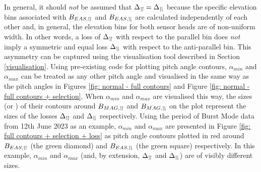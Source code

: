 In general, it should \textit{not} be assumed that \(\Delta_{\upharpoonleft \! \upharpoonright}=\Delta_{\upharpoonleft \! \downharpoonright}\) because the specific elevation bins associated with \(B_{EAS, \upharpoonleft \! \upharpoonright}\) and \(B_{EAS, \upharpoonleft \! \downharpoonright}\) are calculated independently of each other and, in general, the elevation bins for both sensor heads are of non-uniform width\cite{owen2020}\cite{owen2021}. In other words, a loss of \(\Delta_{\upharpoonleft \! \upharpoonright}\) with respect to the parallel bin does \textit{not} imply a symmetric and equal loss \(\Delta_{\upharpoonleft \! \downharpoonright}\) with respect to the anti-parallel bin. This asymmetry can be captured using the visualisation tool described in Section \ref{visualisation}. Using pre-existing code for plotting pitch angle contours, \(\alpha_{min}\) and \(\alpha_{max}\) can be treated as any other pitch angle and visualised in the same way as the pitch angles in Figures \ref{fig: normal - full contours} and Figure \ref{fig: normal - full contours + selection}. When \(\alpha_{min}\) and \(\alpha_{max}\) are visualised this way, the sizes (or ) of their contours around \(B_{MAG, \upharpoonleft \! \upharpoonright}\) and \(B_{MAG, \upharpoonleft \! \downharpoonright}\) on the plot represent the sizes of the losses \(\Delta_{\upharpoonleft \! \upharpoonright}\) and \(\Delta_{\upharpoonleft \! \downharpoonright}\) respectively.  Using the period of Burst Mode data from 12th June 2023 as an example, \(\alpha_{min}\) and \(\alpha_{max}\) are presented in Figure \ref{fig: full contours + selection + loss} as pitch angle contours plotted in red around \(B_{EAS, \upharpoonleft \! \upharpoonright}\) (the green diamond) and \(B_{EAS, \upharpoonleft \! \downharpoonright}\) (the green square) respectively. In this example, \(\alpha_{min}\) and \(\alpha_{max}\) (and, by extension, \(\Delta_{\upharpoonleft \! \upharpoonright}\) and \(\Delta_{\upharpoonleft \! \downharpoonright}\)) are of visibly different sizes.
\\

